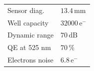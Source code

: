 \begin{frame}[t]
\begin{columns}[T]
\begin{column}{0.65\textwidth}
\begin{tabularx}{\linewidth}{XX}
        Sensor diag.    & $13.4\,\mathrm{mm}$                              \\
        Well capacity   & $32000\,\mathrm{e^{-}}$                          \\
        Dynamic range   & $70\,\mathrm{dB}$                                \\
        QE at 525 nm    & $70\,\mathrm{\%}$                                \\
        Electrons noise & $6.8\,\mathrm{e^{-}}$                            \\
        \bottomrule
      \end{tabularx}
    \end{column}
  \end{columns}
\end{frame}

